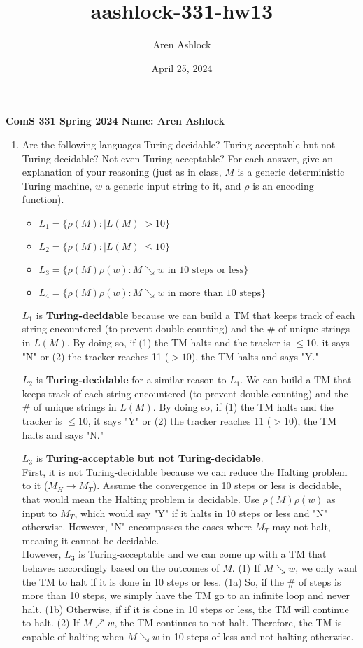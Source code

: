 \documentclass[12pt]{article}
\title{aashlock-331-hw13}
\author{Aren Ashlock}
\date{April 25, 2024}
\begin{document}
\noindent\textbf{ComS 331 \quad Spring 2024 \quad Name: Aren Ashlock}

\begin{enumerate}


\item Are the following languages Turing-decidable? Turing-acceptable but not Turing-decidable? Not even Turing-acceptable? For each answer, give an explanation of your reasoning (just as in class, $M$ is a generic deterministic Turing machine, $w$ a generic input string to it, and $\rho$ is an encoding function).

\begin{itemize}
  \item $L_1 = \{\rho(M) : |L(M)| > 10\}$
  \item $L_2 = \{\rho(M) : |L(M)| \leq 10\}$
  \item $L_3 = \{\rho(M)\rho(w) : M \searrow w \text{ in 10 steps or less}\}$
  \item $L_4 = \{\rho(M)\rho(w) : M \searrow w \text{ in more than 10 steps}\}$
\end{itemize}

\color{blue}
    $L_1$ is \textbf{Turing-decidable} because we can build a TM that keeps track of each string encountered (to prevent double counting) and the \# of unique strings in $L(M)$. By doing so, if (1) the TM halts and the tracker is $\leq 10$, it says "N" or (2) the tracker reaches 11 ($> 10$), the TM halts and says "Y."
    
    $L_2$ is \textbf{Turing-decidable} for a similar reason to $L_1$. We can build a TM that keeps track of each string encountered (to prevent double counting) and the \# of unique strings in $L(M)$. By doing so, if (1) the TM halts and the tracker is $\leq 10$, it says "Y" or (2) the tracker reaches 11 ($> 10$), the TM halts and says "N."
    
    $L_3$ is \textbf{Turing-acceptable but not Turing-decidable}.\\
    First, it is not Turing-decidable because we can reduce the Halting problem to it ($M_H \rightarrow M_T$). Assume the convergence in 10 steps or less is decidable, that would mean the Halting problem is decidable. Use $\rho(M)\rho(w)$ as input to $M_T$, which would say "Y" if it halts in 10 steps or less and "N" otherwise. However, "N" encompasses the cases where $M_T$ may not halt, meaning it cannot be decidable.\\
    However, $L_3$ is Turing-acceptable and we can come up with a TM that behaves accordingly based on the outcomes of $M$. (1) If $M \searrow w$, we only want the TM to halt if it is done in 10 steps or less. (1a) So, if the \# of steps is more than 10 steps, we simply have the TM go to an infinite loop and never halt. (1b) Otherwise, if if it is done in 10 steps or less, the TM will continue to halt. (2) If $M \nearrow w$, the TM continues to not halt. Therefore, the TM is capable of halting when $M \searrow w$ in 10 steps of less and not halting otherwise.
    

\end{enumerate}
\end{document}

